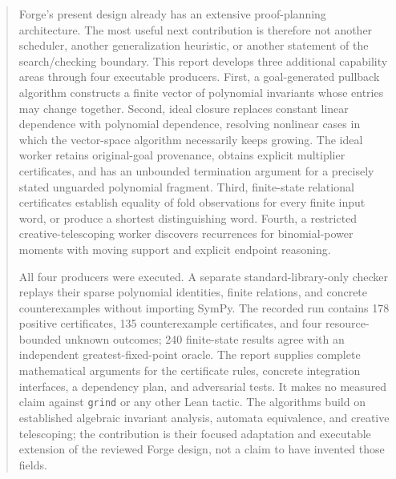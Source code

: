 \documentclass[11pt,letterpaper]{article}
\theoremstyle{definition}
\theoremstyle{remark}
\begin{document}
\begin{abstract}
Forge's present design already has an extensive proof-planning architecture. The most useful next contribution is therefore not another scheduler, another generalization heuristic, or another statement of the search/checking boundary. This report develops three additional capability areas through four executable producers. First, a goal-generated pullback algorithm constructs a finite vector of polynomial invariants whose entries may change together. Second, ideal closure replaces constant linear dependence with polynomial dependence, resolving nonlinear cases in which the vector-space algorithm necessarily keeps growing. The ideal worker retains original-goal provenance, obtains explicit multiplier certificates, and has an unbounded termination argument for a precisely stated unguarded polynomial fragment. Third, finite-state relational certificates establish equality of fold observations for every finite input word, or produce a shortest distinguishing word. Fourth, a restricted creative-telescoping worker discovers recurrences for binomial-power moments with moving support and explicit endpoint reasoning.

All four producers were executed. A separate standard-library-only checker replays their sparse polynomial identities, finite relations, and concrete counterexamples without importing SymPy. The recorded run contains 178 positive certificates, 135 counterexample certificates, and four resource-bounded unknown outcomes; 240 finite-state results agree with an independent greatest-fixed-point oracle. The report supplies complete mathematical arguments for the certificate rules, concrete integration interfaces, a dependency plan, and adversarial tests. It makes no measured claim against \texttt{grind} or any other Lean tactic. The algorithms build on established algebraic invariant analysis, automata equivalence, and creative telescoping; the contribution is their focused adaptation and executable extension of the reviewed Forge design, not a claim to have invented those fields.
\end{abstract}
\tableofcontents
\clearpage








\appendix


\end{document}
